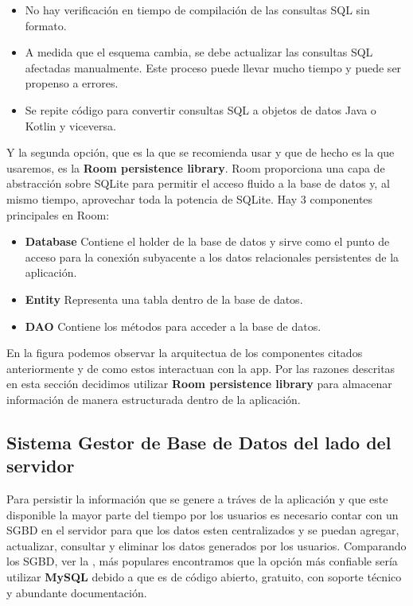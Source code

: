 \begin{itemize}
	\item No hay verificación en tiempo de compilación de las consultas SQL sin formato.
	\item A medida que el esquema cambia, se debe actualizar las consultas SQL afectadas manualmente. Este proceso puede llevar mucho tiempo y puede ser propenso a errores.
	\item Se repite código para convertir consultas SQL a objetos de datos Java o Kotlin y viceversa.
\end{itemize}
Y la segunda opción, que es la que se recomienda usar y que de hecho es la que usaremos, es la \textbf{Room persistence library}. Room proporciona una capa de abstracción sobre SQLite para permitir el acceso fluido a la base de datos y, al mismo tiempo, aprovechar toda la potencia de SQLite.
Hay 3 componentes principales en Room:
\begin{itemize}
	\item \textbf{Database} Contiene el holder de la base de datos y sirve como el punto de acceso para la conexión subyacente a los datos relacionales persistentes de la aplicación.
	\item \textbf{Entity} Representa una tabla dentro de la base de datos.
	\item \textbf{DAO} Contiene los métodos para acceder a la base de datos.
\end{itemize}
En la figura  podemos observar la arquitectua de los componentes citados anteriormente y de como estos interactuan con la app. Por las razones descritas en esta sección decidimos utilizar \textbf{Room persistence library} para almacenar información de manera estructurada dentro de la aplicación.


\subsection{Sistema Gestor de Base de Datos del lado del servidor}
Para persistir la información que se genere a tráves de la aplicación y que este disponible la mayor parte del tiempo por los usuarios es necesario contar con un SGBD en el servidor para que los datos esten centralizados y se puedan agregar, actualizar, consultar y eliminar los datos generados por los usuarios.
Comparando los SGBD, ver la , más populares encontramos que la opción más confiable sería utilizar \textbf{MySQL} debido a que es de código abierto, gratuito, con soporte técnico y abundante documentación.

